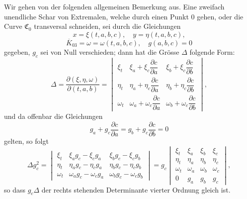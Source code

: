 \documentclass[11pt,a4paper,leqno]{article}
\begin{document}
Wir gehen von der folgenden allgemeinen Bemerkung aus. Eine zweifach unendliche Schar von Extremalen, welche durch einen Punkt 0 gehen, oder die Curve $\mathfrak{C}_0$ transversal schneiden, sei durch die Gleichungen
\[
x=\xi(t,a,b,c),\quad y=\eta(t,a,b,c),
\]
\[
\overline{K}_{03}=\omega=\omega(t,a,b,c),\quad g(a,b,c)=0
\]
gegeben, $g_c$ sei von Null verschieden; dann hat die Grösse $\Delta$ folgende Form:
\begingroup
\setlength{\arraycolsep}{1pt}
\[
\Delta=\frac{\partial(\xi,\eta,\omega)}{\partial(t,a,b)}=
\begin{vmatrix}
\xi_t&\xi_a+\xi_c\dfrac{\partial c}{\partial a}&\xi_b+\xi_c\dfrac{\partial c}{\partial b}\\[1.0ex]
\eta_t&\eta_a+\eta_c\dfrac{\partial c}{\partial a}&\eta_b+\eta_c\dfrac{\partial c}{\partial b}\\[1.0ex]
\omega_t&\omega_a+\omega_c\dfrac{\partial c}{\partial a}&\omega_b+\omega_c\dfrac{\partial c}{\partial b}
\end{vmatrix},
\]
und da offenbar die Gleichungen
\[
g_a+g_c\frac{\partial c}{\partial a}=g_b+g_c\frac{\partial c}{\partial b}=0
\]
gelten, so folgt
\[
\Delta g_c^2=\begin{vmatrix}
\xi_t&\xi_ag_c-\xi_cg_a&\xi_bg_c-\xi_cg_b\\
\eta_t&\eta_ag_c-\eta_cg_a&\eta_bg_c-\eta_cg_b\\
\omega_t&\omega_ag_c-\omega_cg_a&\omega_bg_c-\omega_cg_b
\end{vmatrix}
=g_c\begin{vmatrix}
\xi_t&\xi_a&\xi_b&\xi_c\\
\eta_t&\eta_a&\eta_b&\eta_c\\
\omega_t&\omega_a&\omega_b&\omega_c\\
0&g_a&g_b&g_c
\end{vmatrix},
\]
\endgroup
so dass $g_c\Delta$ der rechts stehenden Determinante vierter Ordnung gleich ist.
\end{document}
